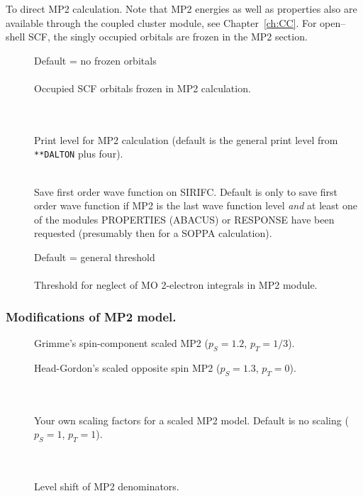 To direct MP2 calculation. Note that MP2 energies as well as
properties also are available through the coupled cluster module, see
Chapter~\ref{ch:CC}.
For open--shell SCF, the singly occupied orbitals are frozen in the MP2 section.

\begin{description}

\item[]
  Default = no frozen orbitals\\
   \\
  Occupied SCF orbitals frozen in MP2 calculation.

\item[] \ \\
   \\
  Print level for MP2 calculation
  (default is the general print level from \verb|**DALTON| plus four).

\item[] \ \\
  Save first order wave function on SIRIFC.
  Default is only to save first order wave function if MP2 is the last wave function level
  \emph{and} at least one of the modules PROPERTIES (ABACUS) or RESPONSE have been
  requested (presumably then for a SOPPA calculation).

\item[]
  Default = general threshold\\
   \\
  Threshold for neglect of MO 2-electron integrals in MP2 module.

\end{description}

\subsubsection*{Modifications of MP2 model.}

\begin{description}

\item[]
  Grimme's spin-component scaled MP2 ($p_S = 1.2$, $p_T = 1/3$).

\item[]
  Head-Gordon's scaled opposite spin MP2 ($p_S = 1.3$, $p_T = 0$).

\item[] \ \\
   \\
  Your own scaling factors for a scaled MP2 model.
  Default is no scaling ($p_S = 1$, $p_T = 1$).

\item[] \ \\
   \\
  Level shift of MP2 denominators.
\end{description}

